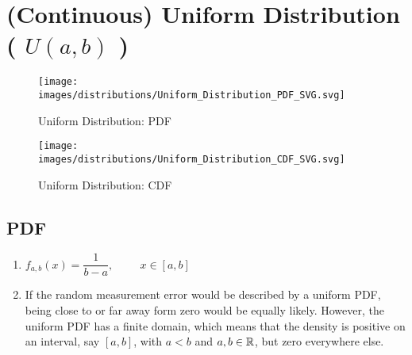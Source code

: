 \section{(Continuous) Uniform Distribution ( $U(a, b)$ )}

\begin{table}[H]
    \hfill
    \begin{minipage}{0.45\linewidth}
        \begin{figure}[H]
            \centering
            \texttt{[image: images/distributions/Uniform\_Distribution\_PDF\_SVG.svg]}
            \caption{Uniform Distribution: PDF \cite{wiki/Continuous_uniform_distribution}}
        \end{figure}
    \end{minipage}
    \hfill
    \begin{minipage}{0.45\linewidth}
        \begin{figure}[H]
            \centering
            \texttt{[image: images/distributions/Uniform\_Distribution\_CDF\_SVG.svg]}
            \caption{Uniform Distribution: CDF \cite{wiki/Continuous_uniform_distribution}}
        \end{figure}
    \end{minipage}
    \hfill
\end{table}

\subsection{PDF}

\begin{enumerate}
    \item[] $f_{a,b}(x) = \dfrac {1}{b-a}, \hspace{1cm} x \in [a, b]$
    \hfill \cite{statistics/book/Statistics-for-Data-Scientists/Maurits-Kaptein}

    \item If the random measurement error would be described by a uniform PDF, being close to or far away form zero would be equally likely.
    However, the uniform PDF has a finite domain, which means that the density is positive on an interval, say $[a, b]$, with $a < b$ and $a, b \in \mathbb{R}$, but zero everywhere else.
    \hfill \cite{statistics/book/Statistics-for-Data-Scientists/Maurits-Kaptein}
\end{enumerate}



